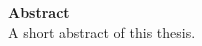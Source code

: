 \vspace*{2cm}

\vspace{10ex}
{\bf\Large Abstract} \\ [1em]
A short abstract of this thesis.

\cleardoublepage
